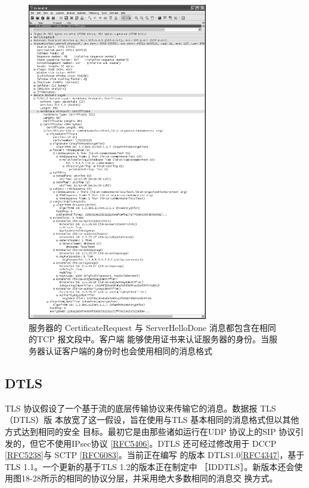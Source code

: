 \begin{figure}[!htb]
    \centering
	\includegraphics[width=0.7\textwidth]{imgs/18/18-34.png}
	\caption{服务器的 CertificateRequest 与 ServerHelloDone 消息都包含在相同的TCP 报文段中。客户端
            能够使用证书来认证服务器的身份。当服务器认证客户端的身份时也会使用相同的消息格式}
\end{figure}

\subsection{DTLS}
TLS 协议假设了一个基于流的底层传输协议来传输它的消息。数据报 TLS（DTLS）版
本放宽了这一假设，旨在使用与TLS 基本相同的消息格式但以其他方式达到相同的安全
目标。最初它是由那些诸如运行在UDP 协议上的SIP 协议引发的，但它不使用IPsec协议
\href{https://www.rfc-editor.org/rfc/rfc5406}{[RFC5406]}。DTLS 还可经过修改用于 DCCP \href{https://www.rfc-editor.org/rfc/rfc5238}{[RFC5238]}与 SCTP \href{https://www.rfc-editor.org/rfc/rfc6083}{[RFC6083]}。当前正在编写
的版本 DTLS1.0\href{https://www.rfc-editor.org/rfc/rfc4347}{[RFC4347]}，基于 TLS 1.1。一个更新的基于TLS 1.2的版本正在制定中
［IDDTLS］。新版本还会使用图18-28所示的相同的协议分层，并采用绝大多数相同的消息交
换方式。

